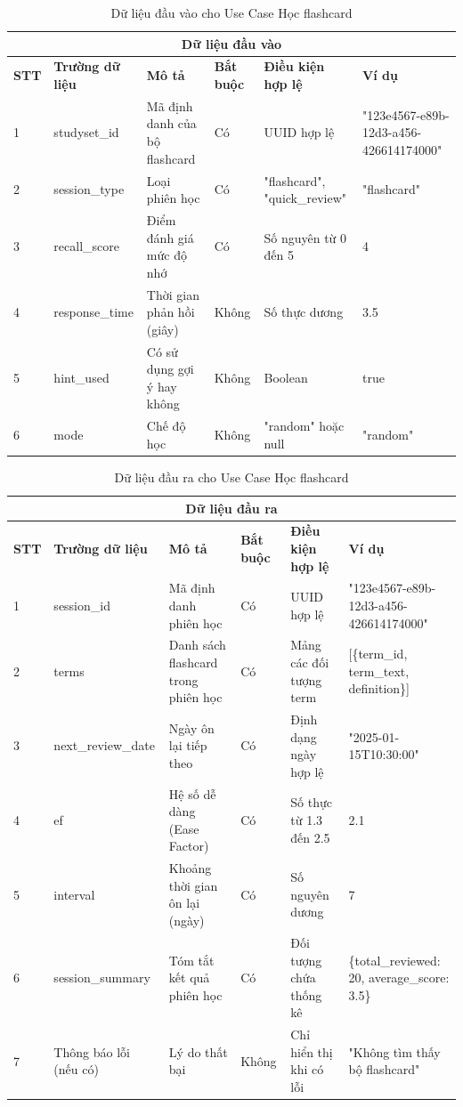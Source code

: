\documentclass[../DoAn.tex]{subfiles}
\begin{document}
\begin{table}[h!]
\centering
\begin{tabular}{|m{1cm}|m{2.5cm}|m{3cm}|m{1cm}|m{2.5cm}|m{3.5cm}|}
    \hline
    \multicolumn{6}{|c|}{\textbf{Dữ liệu đầu vào}} \\
    \hline
    \textbf{STT} & \textbf{Trường dữ liệu} & \textbf{Mô tả} & \textbf{Bắt buộc} & \textbf{Điều kiện hợp lệ} & \textbf{Ví dụ} \\
    \hline
    1 & studyset\_id & Mã định danh của bộ flashcard & Có & UUID hợp lệ & "123e4567-e89b-12d3-a456-426614174000" \\
    \hline
    2 & session\_type & Loại phiên học & Có & "flashcard", "quick\_review" & "flashcard" \\
    \hline
    3 & recall\_score & Điểm đánh giá mức độ nhớ & Có & Số nguyên từ 0 đến 5 & 4 \\
    \hline
    4 & response\_time & Thời gian phản hồi (giây) & Không & Số thực dương & 3.5 \\
    \hline
    5 & hint\_used & Có sử dụng gợi ý hay không & Không & Boolean & true \\
    \hline
    6 & mode & Chế độ học & Không & "random" hoặc null & "random" \\
    \hline
\end{tabular}
\caption{Dữ liệu đầu vào cho Use Case Học flashcard}
\end{table}

\vspace{0.5cm}

\begin{table}[h!]
\centering
\begin{tabular}{|m{1cm}|m{2.5cm}|m{3cm}|m{1cm}|m{2.5cm}|m{3.5cm}|}
    \hline
    \multicolumn{6}{|c|}{\textbf{Dữ liệu đầu ra}} \\
    \hline
    \textbf{STT} & \textbf{Trường dữ liệu} & \textbf{Mô tả} & \textbf{Bắt buộc} & \textbf{Điều kiện hợp lệ} & \textbf{Ví dụ} \\
    \hline
    1 & session\_id & Mã định danh phiên học & Có & UUID hợp lệ & "123e4567-e89b-12d3-a456-426614174000" \\
    \hline
    2 & terms & Danh sách flashcard trong phiên học & Có & Mảng các đối tượng term & [\{term\_id, term\_text, definition\}] \\
    \hline
    3 & next\_review\_date & Ngày ôn lại tiếp theo & Có & Định dạng ngày hợp lệ & "2025-01-15T10:30:00" \\
    \hline
    4 & ef & Hệ số dễ dàng (Ease Factor) & Có & Số thực từ 1.3 đến 2.5 & 2.1 \\
    \hline
    5 & interval & Khoảng thời gian ôn lại (ngày) & Có & Số nguyên dương & 7 \\
    \hline
    6 & session\_summary & Tóm tắt kết quả phiên học & Có & Đối tượng chứa thống kê & \{total\_reviewed: 20, average\_score: 3.5\} \\
    \hline
    7 & Thông báo lỗi (nếu có) & Lý do thất bại & Không & Chỉ hiển thị khi có lỗi & "Không tìm thấy bộ flashcard" \\
    \hline
\end{tabular}
\caption{Dữ liệu đầu ra cho Use Case Học flashcard}
\end{table}
\end{document}
